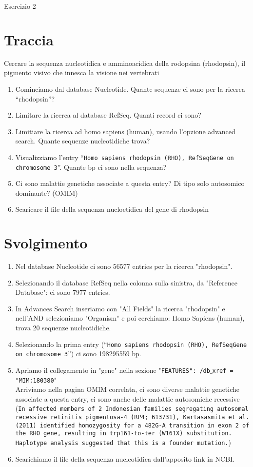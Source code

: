 \documentclass{article}
\begin{document}
\begin{center}
   \huge
   Esercizio 2
\end{center}
\section*{Traccia}
Cercare la sequenza nucleotidica e amminoacidica della rodopsina (rhodopsin), il pigmento visivo che innesca la visione nei vertebrati
\begin{enumerate}
   \item Cominciamo dal database Nucleotide. Quante sequenze ci sono per la ricerca “rhodopsin”?
   \item Limitare la ricerca al database RefSeq. Quanti record ci sono?
   \item Limitiare la ricerca ad homo sapiens (human), usando l'opzione advanced search. Quante sequenze nucleotidiche trova?
   \item Visualizziamo l'entry “\texttt{Homo sapiens rhodopsin (RHO), RefSeqGene on chromosome 3}”. Quante bp ci sono nella sequenza?
   \item Ci sono malattie genetiche associate a questa entry? Di tipo solo autosomico dominante? (OMIM)
   \item Scaricare il file della sequenza nucloetidica del gene di rhodopsin
\end{enumerate}
\section*{Svolgimento}
\begin{enumerate}
   \item Nel database Nucleotide ci sono 56577 entries per la ricerca "rhodopsin".
   \item Selezionando il database RefSeq nella colonna sulla sinistra, da "Reference Database": ci sono 7977 entries.
   \item In Advances Search inseriamo con "All Fields" la ricerca "rhodopsin" e nell'AND selezioniamo "Organism" e poi cerchiamo: Homo Sapiens (human), trova 20 sequenze nucleotidiche.
   \item Selezionando la prima entry (“\texttt{Homo sapiens rhodopsin (RHO), RefSeqGene on chromosome 3}”) ci sono 198295559 bp. 
   \item Apriamo il collegamento in "gene" nella sezione "\texttt{FEATURES": /db$\_$xref = "MIM:180380}"\\Arriviamo nella pagina OMIM correlata, ci sono diverse malattie genetiche associate a questa entry, ci sono anche delle malattie autosomiche recessive (\texttt{In affected members of 2 Indonesian families segregating autosomal recessive retinitis pigmentosa-4 (RP4; 613731), Kartasasmita et al. (2011) identified homozygosity for a 482G-A transition in exon 2 of the RHO gene, resulting in trp161-to-ter (W161X) substitution. Haplotype analysis suggested that this is a founder mutation.})
   \item Scarichiamo il file della sequenza nucleotidica dall'apposito link in NCBI.
\end{enumerate}
\end{document}
